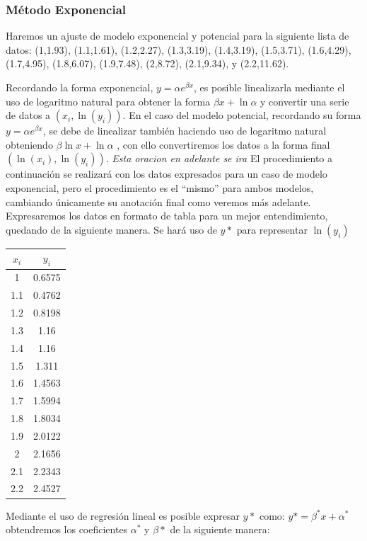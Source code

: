\documentclass[11pt,letterpaper]{article}
\begin{document}
\subsubsection{Método Exponencial}
Haremos un ajuste de modelo exponencial y potencial para la siguiente lista de datos: (1,1.93), (1.1,1.61), (1.2,2.27), (1.3,3.19), (1.4,3.19), (1.5,3.71), (1.6,4.29), (1.7,4.95), (1.8,6.07), (1.9,7.48), (2,8.72), (2.1,9.34), y (2.2,11.62). \par
Recordando la forma exponencial, $y = \alpha e^{\beta x}$, es posible linealizarla mediante el uso de logaritmo natural para obtener la forma $\beta x + \ln \alpha$ y convertir una serie de datos a $(x_i, \ln(y_i))$. En el caso del modelo potencial, recordando su forma $y = \alpha e^{\beta x}$, se debe de linealizar también haciendo uso de logaritmo natural obteniendo $\beta \ln x + \ln \alpha$ , con ello convertiremos los datos a la forma final $(\ln(x_i), \ln(y_i))$. \textit{Esta oracion en adelante se ira} El procedimiento a continuación se realizará con los datos expresados para un caso de modelo exponencial, pero el procedimiento es el ``mismo'' para ambos modelos, cambiando únicamente su anotación final como veremos más adelante. Expresaremos los datos en formato de tabla para un mejor entendimiento, quedando de la siguiente manera. Se hará uso de $y*$ para representar $\ln(y_i)$
\begin{table}[H]
	\centering
	\begin{tabular}{c | c}
	\hline
		$x_i$ & $y_i$ \\ \hline
        1	& 0.6575 \\
        1.1	& 0.4762 \\
        1.2	& 0.8198 \\
        1.3	& 1.16 \\
        1.4	& 1.16 \\
        1.5	& 1.311 \\
        1.6	& 1.4563 \\
        1.7	& 1.5994 \\
        1.8	& 1.8034 \\
        1.9	& 2.0122 \\
        2	& 2.1656 \\
        2.1	& 2.2343 \\
        2.2	& 2.4527 \\ \hline
	\end{tabular}
\end{table}
Mediante el uso de regresión lineal es posible expresar $y*$ como: \textbf{$y* = \beta^* x + \alpha^*$ 	} obtendremos los coeficientes $\alpha^*$ y $\beta*$ de la siguiente manera:
\end{document}
